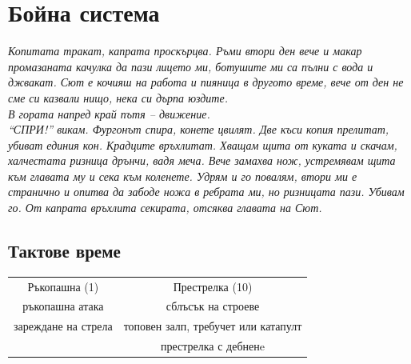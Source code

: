 \section{Бойна система}
\emph{Копитата тракат, капрата проскърцва.
Ръми втори ден вече и макар промазаната качулка да пази лицето ми, ботушите ми са пълни с вода и джвакат.
Сют е кочияш на работа и пияница в другото време, вече от ден не сме си казвали нищо, нека си дърпа юздите.
\\
В гората напред край пътя – движение.
\\
“СПРИ!” викам.
Фургонът спира, конете цвилят.
Две къси копия прелитат, убиват единия кон.
Крадците връхлитат.
Хващам щита от куката и скачам, халчестата ризница дрънчи, вадя меча.
Вече замахва нож, устремявам щита към главата му и сека към коленете.
Удрям и го повалям, втори ми е странично и опитва да забоде ножа в ребрата ми, но ризницата пази.
Убивам го. От капрата връхлита секирата, отсяква главата на Сют.}


\subsection{Тактове време}
\begin{tabular}{c | c}
Ръкопашна (1)       & Престрелка (10)                      \\   %
ръкопашна атака     & сблъсък на строеве                   \\
зареждане на стрела & топовен залп, требучет или катапулт  \\
                    & престрелка с дебненe
\end{tabular}

